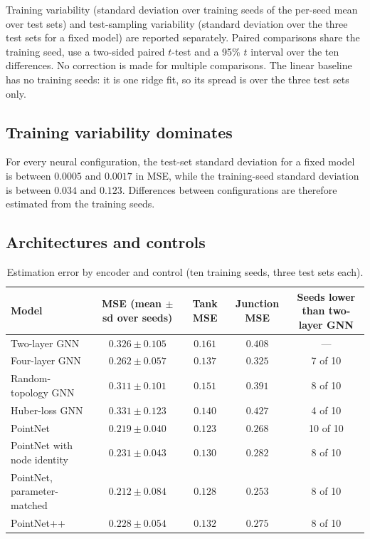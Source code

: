 \documentclass[conference]{IEEEtran}
\begin{document}
Training variability (standard deviation over training seeds of the per-seed mean over test sets) and test-sampling variability (standard deviation over the three test sets for a fixed model) are reported separately. Paired comparisons share the training seed, use a two-sided paired $t$-test and a 95\% $t$ interval over the ten differences. No correction is made for multiple comparisons. The linear baseline has no training seeds: it is one ridge fit, so its spread is over the three test sets only.

\subsection{Training variability dominates}

For every neural configuration, the test-set standard deviation for a fixed model is between $0.0005$ and $0.0017$ in MSE, while the training-seed standard deviation is between $0.034$ and $0.123$. Differences between configurations are therefore estimated from the training seeds.

\subsection{Architectures and controls}

\begin{table}[t]
\centering
\caption{Estimation error by encoder and control (ten training seeds, three test sets each).}
\label{tab:archs}
\small
\begin{tabular}{lcccc}
\toprule
Model & MSE (mean $\pm$ sd over seeds) & Tank MSE & Junction MSE & Seeds lower than two-layer GNN \\
\midrule
Two-layer GNN & $0.326\pm0.105$ & $0.161$ & $0.408$ & --- \\
Four-layer GNN & $0.262\pm0.057$ & $0.137$ & $0.325$ & 7 of 10 \\
Random-topology GNN & $0.311\pm0.101$ & $0.151$ & $0.391$ & 8 of 10 \\
Huber-loss GNN & $0.331\pm0.123$ & $0.140$ & $0.427$ & 4 of 10 \\
PointNet & $0.219\pm0.040$ & $0.123$ & $0.268$ & 10 of 10 \\
PointNet with node identity & $0.231\pm0.043$ & $0.130$ & $0.282$ & 8 of 10 \\
PointNet, parameter-matched & $0.212\pm0.084$ & $0.128$ & $0.253$ & 8 of 10 \\
PointNet++ & $0.228\pm0.054$ & $0.132$ & $0.275$ & 8 of 10 \\
\bottomrule
\end{tabular}
\end{table}
\end{document}
